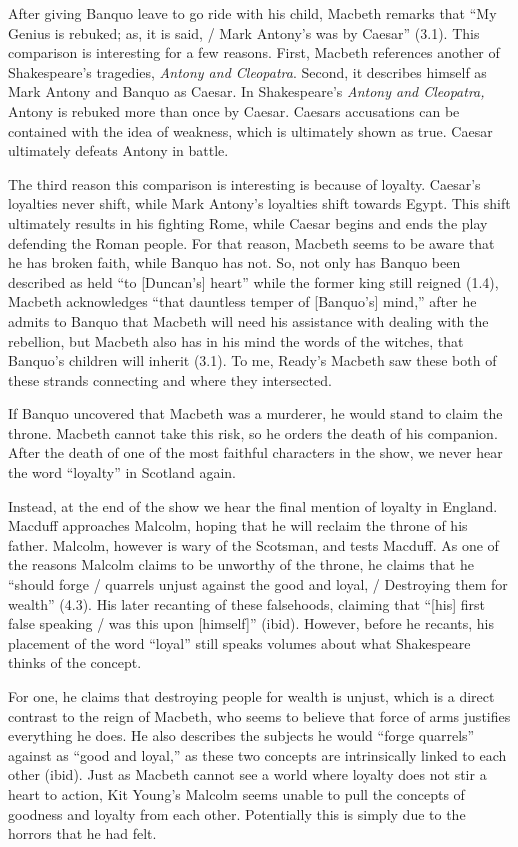 \documentclass[12pt]{article}[titlepage]
\newcommand{\say}[1]{``#1''}
\newcommand{\1}{\={a}}
\newcommand{\2}{\={e}}
\newcommand{\3}{\={\i}}
\newcommand{\4}{\=o}
\newcommand{\5}{\=u}
\newcommand{\6}{\={A}}
\renewcommand{\,}{\textsuperscript{,}}
\begin{document}
After giving Banquo leave to go ride with his child, Macbeth remarks that \say{My Genius is rebuked; as, it is said, / Mark Antony's was by Caesar} (3.1).
This comparison is interesting for a few reasons.
First, Macbeth references another of Shakespeare's tragedies, \textit{Antony and Cleopatra}.
Second, it describes himself as Mark Antony and Banquo as Caesar.
In Shakespeare's \textit{Antony and Cleopatra,} Antony is rebuked more than once by Caesar.
Caesars accusations can be contained with the idea of weakness, which is ultimately shown as true.
Caesar ultimately defeats Antony in battle.

The third reason this comparison is interesting is because of loyalty.
Caesar's loyalties never shift, while Mark Antony's loyalties shift towards Egypt.
This shift ultimately results in his fighting Rome, while Caesar begins and ends the play defending the Roman people.
For that reason, Macbeth seems to be aware that he has broken faith, while Banquo has not.
So, not only has Banquo been described as held \say{to [Duncan's] heart} while the former king still reigned (1.4), Macbeth acknowledges \say{that dauntless temper of [Banquo's] mind,} after he admits to Banquo that Macbeth will need his assistance with dealing with the rebellion, but Macbeth also has in his mind the words of the witches, that Banquo's children will inherit (3.1).
To me, Ready's Macbeth saw these both of these strands connecting and where they intersected.

If Banquo uncovered that Macbeth was a murderer, he would stand to claim the throne.
Macbeth cannot take this risk, so he orders the death of his companion.
After the death of one of the most faithful characters in the show, we never hear the word \say{loyalty} in Scotland again.

Instead, at the end of the show we hear the final mention of loyalty in England.
Macduff approaches Malcolm, hoping that he will reclaim the throne of his father.
Malcolm, however is wary of the Scotsman, and tests Macduff.
As one of the reasons Malcolm claims to be unworthy of the throne, he claims that he \say{should forge / quarrels unjust against the good and loyal, / Destroying them for wealth} (4.3).
His later recanting of these falsehoods, claiming that \say{[his] first false speaking / was this upon [himself]} (ibid).
However, before he recants, his placement of the word \say{loyal} still speaks volumes about what Shakespeare thinks of the concept.

For one, he claims that destroying people for wealth is unjust, which is a direct contrast to the reign of Macbeth, who seems to believe that force of arms justifies everything he does.
He also describes the subjects he would \say{forge quarrels} against as \say{good and loyal,} as these two concepts are intrinsically linked to each other (ibid).
Just as Macbeth cannot see a world where loyalty does not stir a heart to action, Kit Young's Malcolm seems unable to pull the concepts of goodness and loyalty from each other.
Potentially this is simply due to the horrors that he had felt.
\end{document}
